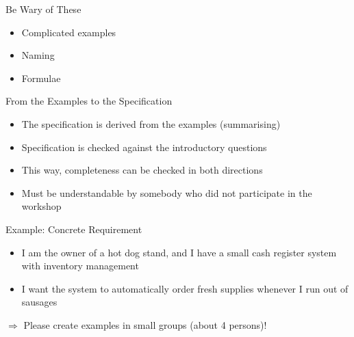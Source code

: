 \begin{frame}{Be Wary of These}

\begin{itemize}
   \item Complicated examples
   
   \item Naming
   
   \item Formulae
\end{itemize}


\end{frame}



\begin{frame}{From the Examples to the Specification}

\begin{itemize}
	\item The specification is derived from the examples (summarising)
	\item Specification is checked against the introductory questions
	\item This way, completeness can be checked in both directions
	\item Must be understandable by somebody who did not participate in the workshop
\end{itemize}

\end{frame}
 
\begin{frame}{Example: Concrete Requirement}

\begin{itemize}
      	\item I am the owner of a hot dog stand, and I have a small cash register system with inventory management
	\item I want the system to automatically order fresh supplies whenever I run out of sausages

\end{itemize}
	
$\Rightarrow$ Please create examples in small groups (about 4 persons)!

\end{frame}

%


